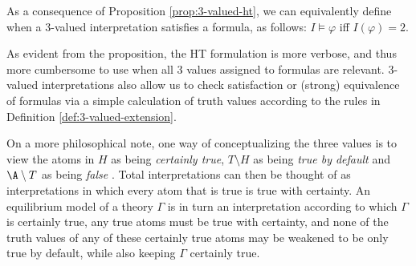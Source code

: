 As a consequence of Proposition \ref{prop:3-valued-ht}, we can
equivalently define when a 3-valued interpretation satisfies a
formula, as follows: $I \models \varphi$ iff $I(\varphi)=2$.

As evident from the proposition, the HT formulation is more verbose,
and thus more cumbersome to use when all 3 values assigned to formulas
are relevant. 3-valued interpretations also allow us to check
satisfaction or (strong) equivalence of formulas via a simple
calculation of truth values according to the rules in Definition
\ref{def:3-valued-extension}.

On a more philosophical note, one way of conceptualizing the three
values is to view the atoms in $H$ as being \textit{certainly true},
$T \setminus H$ as being \textit{true by default} and $\A \setminus T$
as being \textit{false} \cite{capeva17a}. Total interpretations can
then be thought of as interpretations in which every atom that is true
is true with certainty. An equilibrium model of a theory $\Gamma$ is in
turn an interpretation according to which $\Gamma$ is certainly true,
any true atoms must be true with certainty, and none of the truth
values of any of these certainly true atoms may be weakened to be only
true by default, while also keeping $\Gamma$ certainly true.
